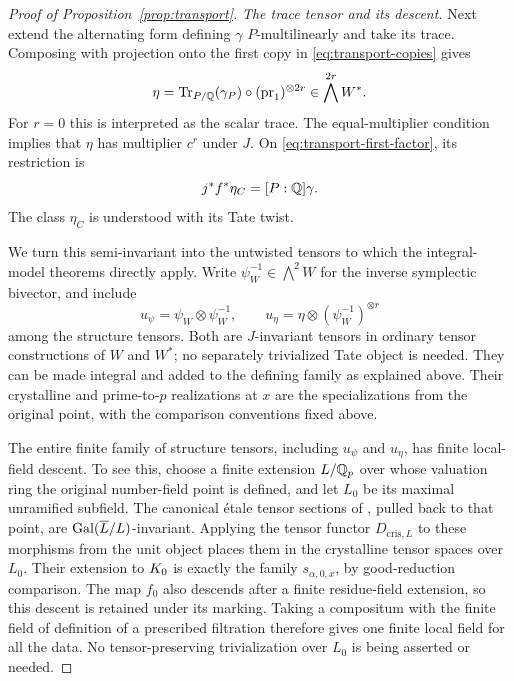 \begin{proof}[Proof of Proposition~\ref{prop:transport}]
\medskip\noindent
\emph{The trace tensor and its descent.}
Next extend the alternating form defining $\gamma$
$P$-multilinearly and take its trace.  Composing with projection
onto the first copy in \eqref{eq:transport-copies} gives
\begin{equation}
 \eta=\operatorname{Tr}_{P/\mathbb Q}(\gamma_P)\circ
              (\operatorname{pr}_1)^{\otimes 2r}
       \in\bigwedge^{2r}W^*.
 \label{eq:transport-trace-tensor}
\end{equation}
For $r=0$ this is interpreted as the scalar trace.
The equal-multiplier condition implies that $\eta$ has multiplier
$c^r$ under $J$.  On \eqref{eq:transport-first-factor}, its
restriction is
\begin{equation}
 j^*f^*\eta_C=[P:\mathbb Q]\gamma.
 \label{eq:transport-trace-restriction}
\end{equation}
The class $\eta_C$ is understood with its Tate twist.

We turn this semi-invariant into the untwisted tensors to which
the integral-model theorems directly apply.  Write
$\psi_W^{-1}\in\bigwedge^2W$ for the inverse symplectic
bivector, and include
\begin{equation}
 u_\psi=\psi_W\otimes\psi_W^{-1},\qquad
 u_\eta=\eta\otimes(\psi_W^{-1})^{\otimes r}
 \label{eq:transport-untwisted-tensors}
\end{equation}
among the structure tensors.  Both are $J$-invariant tensors in
ordinary tensor constructions of $W$ and $W^*$; no separately
trivialized Tate object is needed.  They can be made integral and
added to the defining family as explained above.  Their
crystalline and prime-to-$p$ realizations at $x$ are the
specializations from the original point, with the comparison
conventions fixed above.

\label{par:transport-tensor-descent}
The entire finite family of structure tensors, including
$u_\psi$ and $u_\eta$, has finite local-field descent.  To see
this, choose a finite extension $L/\mathbb Q_p$ over whose valuation
ring the original number-field point is defined, and let $L_0$
be its maximal unramified subfield.  The canonical \'etale
tensor sections of \cite[\S2.1.4]{KisinZhou2025}, pulled back
to that point, are $\operatorname{Gal}(\overline L/L)$-invariant.  Applying
the tensor functor $D_{\mathrm{cris},L}$ to these morphisms
from the unit object places them in the crystalline tensor
spaces over $L_0$.  Their extension to $K_0$ is exactly
the family $s_{\alpha,0,x}$, by good-reduction comparison.
The map $f_0$ also descends after a finite residue-field
extension, so this descent is retained under its marking.
Taking a compositum with the finite field of definition of a
prescribed filtration therefore gives one finite local field
for all the data.  No tensor-preserving trivialization over
$L_0$ is being asserted or needed.


\end{proof}
